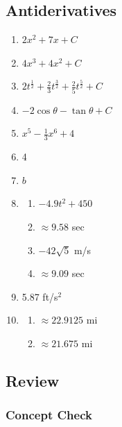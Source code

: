 \documentclass{article}
\begin{document}
\subsection{Antiderivatives}
\begin{enumerate}
  \item $2x^2+7x+C$
    \setcounter{enumi}{4}
  \item $4x^3+4x^2+C$
    \setcounter{enumi}{14}
  \item $2t^\frac{1}{2}+\frac{2}{3}t^\frac{3}{2}+\frac{2}{5}t^\frac{5}{2}+C$
    \setcounter{enumi}{16}
  \item $-2\cos\theta-\tan\theta+C$
    \setcounter{enumi}{20}
  \item $x^5-\frac{1}{3}x^6+4$
    \setcounter{enumi}{42}
  \item 4
    \setcounter{enumi}{44}
  \item $b$
    \setcounter{enumi}{58}
  \item
    \begin{enumerate}
      \item $-4.9t^2+450$
      \item $\approx9.58$ sec
      \item $-42\sqrt{5}$ m/s
      \item $\approx9.09$ sec
    \end{enumerate}
    \setcounter{enumi}{68}
  \item 5.87 ft/s$^2$
    \setcounter{enumi}{72}
  \item
    \begin{enumerate}
      \item $\approx22.9125$ mi
      \item $\approx21.675$ mi
    \end{enumerate}
\end{enumerate}

\subsection*{Review}
\subsubsection*{Concept Check}
\end{document}
